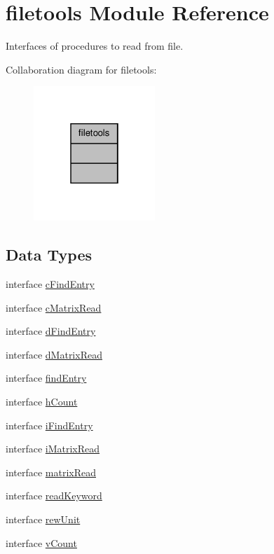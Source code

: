 \hypertarget{classfiletools}{\section{filetools Module Reference}
\label{classfiletools}
}


Interfaces of procedures to read from file.  




Collaboration diagram for filetools\-:\nopagebreak
\begin{figure}[H]
\begin{center}
\leavevmode
\includegraphics[width=130pt]{classfiletools__coll__graph}
\end{center}
\end{figure}
\subsection*{Data Types}
\begin{DoxyCompactItemize}
\item 
interface \hyperlink{interfacefiletools_1_1c_find_entry}{c\-Find\-Entry}
\item 
interface \hyperlink{interfacefiletools_1_1c_matrix_read}{c\-Matrix\-Read}
\item 
interface \hyperlink{interfacefiletools_1_1d_find_entry}{d\-Find\-Entry}
\item 
interface \hyperlink{interfacefiletools_1_1d_matrix_read}{d\-Matrix\-Read}
\item 
interface \hyperlink{interfacefiletools_1_1find_entry}{find\-Entry}
\item 
interface \hyperlink{interfacefiletools_1_1h_count}{h\-Count}
\item 
interface \hyperlink{interfacefiletools_1_1i_find_entry}{i\-Find\-Entry}
\item 
interface \hyperlink{interfacefiletools_1_1i_matrix_read}{i\-Matrix\-Read}
\item 
interface \hyperlink{interfacefiletools_1_1matrix_read}{matrix\-Read}
\item 
interface \hyperlink{interfacefiletools_1_1read_keyword}{read\-Keyword}
\item 
interface \hyperlink{interfacefiletools_1_1rew_unit}{rew\-Unit}
\item 
interface \hyperlink{interfacefiletools_1_1v_count}{v\-Count}
\end{DoxyCompactItemize}



